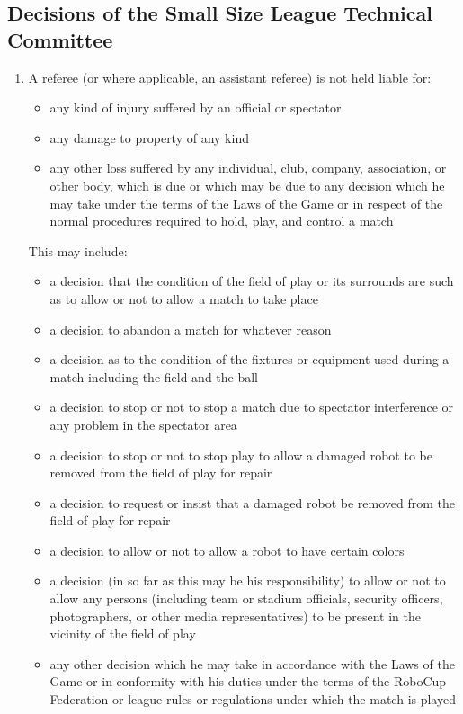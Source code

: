 \subsection*{Decisions of the Small Size League Technical Committee}
\begin{enumerate}
\item
A referee (or where applicable, an assistant referee) is not held liable for:
\begin{itemize}
\item any kind of injury suffered by an official or spectator
\item any damage to property of any kind
\item any other loss suffered by any individual, club, company, association, or other body, which is due or which may be due to any decision which he may take under the terms of the Laws of the Game or in respect of the normal procedures required to hold, play, and control a match
\end{itemize}

This may include:
\begin{itemize}
\item a decision that the condition of the field of play or its surrounds are such as to allow or not to allow a match to take place
\item a decision to abandon a match for whatever reason
\item a decision as to the condition of the fixtures or equipment used during a match including the field and the ball
\item a decision to stop or not to stop a match due to spectator interference or any problem in the spectator area
\item a decision to stop or not to stop play to allow a damaged robot to be removed from the field of play for repair
\item a decision to request or insist that a damaged robot be removed from the field of play for repair
\item a decision to allow or not to allow a robot to have certain colors
\item a decision (in so far as this may be his responsibility) to allow or not to allow any persons (including team or stadium officials, security officers, photographers, or other media representatives) to be present in the vicinity of the field of play
\item any other decision which he may take in accordance with the Laws of the Game or in conformity with his duties under the terms of the RoboCup Federation or league rules or regulations under which the match is played
\end{itemize}


\end{enumerate}
